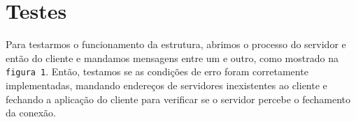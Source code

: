 \documentclass[10pt,twocolumn,letterpaper]{article}
\begin{document}
\section{Testes}

Para testarmos o funcionamento da estrutura, abrimos o processo do servidor e então do cliente e mandamos mensagens entre um e outro, como mostrado na \texttt{figura 1}. Então, testamos se as condições de erro foram corretamente implementadas, mandando endereços de servidores inexistentes ao cliente e fechando a aplicação do cliente para verificar se o servidor percebe o fechamento da conexão.

{\small


}
\end{document}
